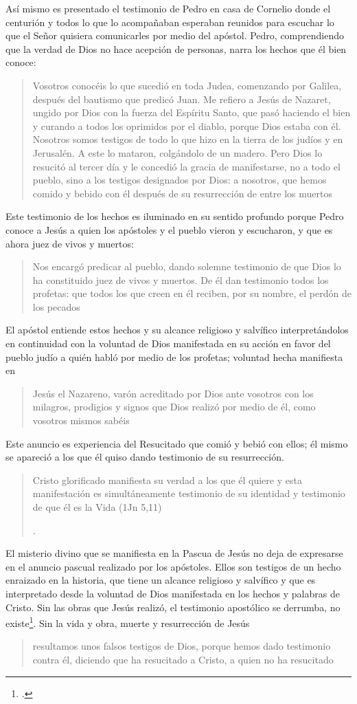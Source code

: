 Así mismo es presentado el testimonio de Pedro en casa de Cornelio donde el centurión y todos lo que lo acompañaban esperaban reunidos para escuchar lo que el Señor quisiera comunicarles por medio del apóstol. Pedro, comprendiendo que la verdad de Dios no hace acepción de personas, narra los hechos que él bien conoce: \blockquote[][\,(Hch 10,37-41)]{Vosotros conocéis lo que sucedió en toda Judea, comenzando por Galilea, después del bautismo que predicó Juan. Me refiero a Jesús de Nazaret, ungido por Dios con la fuerza del Espíritu Santo, que pasó haciendo el bien y curando a todos los oprimidos por el diablo, porque Dios estaba con él. Nosotros somos testigos de todo lo que hizo en la tierra de los judíos y en Jerusalén. A este lo mataron, colgándolo de un madero. Pero Dios lo resucitó al tercer día y le concedió la gracia de manifestarse, no a todo el pueblo, sino a los testigos designados por Dios: a nosotros, que hemos comido y bebido con él después de su resurrección de entre los muertos}. Este testimonio de los hechos es iluminado en su sentido profundo porque Pedro conoce a Jesús a quien los apóstoles y el pueblo vieron y escucharon, y que es ahora juez de vivos y muertos: \blockquote[][\,(Hch 10,42-43)]{Nos encargó predicar al pueblo, dando solemne testimonio de que Dios lo ha constituido juez de vivos y muertos. De él dan testimonio todos los profetas: que todos los que creen en él reciben, por su nombre, el perdón de los pecados}.

El apóstol entiende estos hechos y su alcance religioso y salvífico interpretándolos en continuidad con la voluntad de Dios manifestada en su acción en favor del pueblo judío a quién habló por medio de los profetas; voluntad hecha manifiesta en \blockquote[][\,(Hch 2,22)]{Jesús el Nazareno, varón acreditado por Dios ante vosotros con los milagros, prodigios y signos que Dios realizó por medio de él, como vosotros mismos sabéis}.

Este anuncio es experiencia del Resucitado que comió y bebió con ellos; él mismo se apareció a los que él quiso dando testimonio de su resurrección. \blockquote[{\Cite[129]{prades2015testimonio}}.]{Cristo glorificado manifiesta su verdad a los que él quiere y esta manifestación es simultáneamente testimonio de su identidad y testimonio de que él es la Vida (1Jn 5,11)}.

El misterio divino que se manifiesta en la Pascua de Jesús no deja de expresarse en el anuncio pascual realizado por los apóstoles. Ellos son testigos de un hecho enraizado en la historia, que tiene un alcance religioso y salvífico y que es interpretado desde la voluntad de Dios manifestada en los hechos y palabras de Cristo. Sin las obras que Jesús realizó, el testimonio apostólico se derrumba, no existe\footcite[Cf.][1529]{latourelle2000testimonio}. Sin la vida y obra, muerte y resurrección de Jesús \blockquote[][\,(1Cor 15,15)]{resultamos unos falsos testigos de Dios, porque hemos dado testimonio contra él, diciendo que ha resucitado a Cristo, a quien no ha resucitado}.

